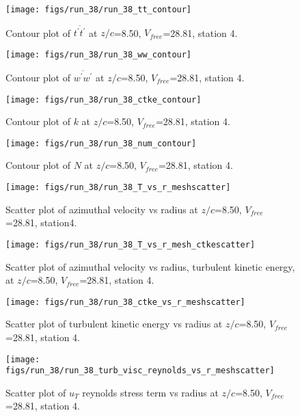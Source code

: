 \begin{figure}[H]
\centering
\texttt{[image: figs/run\_38/run\_38\_tt\_contour]}
\caption{Contour plot of $\overline{t^\prime t^\prime}$ at $z/c$=8.50, $V_{free}$=28.81, station 4.}
\end{figure}


\begin{figure}[H]
\centering
\texttt{[image: figs/run\_38/run\_38\_ww\_contour]}
\caption{Contour plot of $\overline{w^\prime w^\prime}$ at $z/c$=8.50, $V_{free}$=28.81, station 4.}
\end{figure}


\begin{figure}[H]
\centering
\texttt{[image: figs/run\_38/run\_38\_ctke\_contour]}
\caption{Contour plot of $k$ at $z/c$=8.50, $V_{free}$=28.81, station 4.}
\end{figure}


\begin{figure}[H]
\centering
\texttt{[image: figs/run\_38/run\_38\_num\_contour]}
\caption{Contour plot of $N$ at $z/c$=8.50, $V_{free}$=28.81, station 4.}
\end{figure}


\begin{figure}[H]
\centering
\texttt{[image: figs/run\_38/run\_38\_T\_vs\_r\_meshscatter]}
\caption{Scatter plot of azimuthal velocity vs radius at $z/c$=8.50, $V_{free}$=28.81, station4.}
\end{figure}


\begin{figure}[H]
\centering
\texttt{[image: figs/run\_38/run\_38\_T\_vs\_r\_mesh\_ctkescatter]}
\caption{Scatter plot of azimuthal velocity vs radius, turbulent kinetic energy, at $z/c$=8.50, $V_{free}$=28.81, station 4.}
\end{figure}


\begin{figure}[H]
\centering
\texttt{[image: figs/run\_38/run\_38\_ctke\_vs\_r\_meshscatter]}
\caption{Scatter plot of turbulent kinetic energy vs radius at $z/c$=8.50, $V_{free}$=28.81, station 4.}
\end{figure}


\begin{figure}[H]
\centering
\texttt{[image: figs/run\_38/run\_38\_turb\_visc\_reynolds\_vs\_r\_meshscatter]}
\caption{Scatter plot of $
u_T$ reynolds stress term vs radius at $z/c$=8.50, $V_{free}$=28.81, station 4.}
\end{figure}


